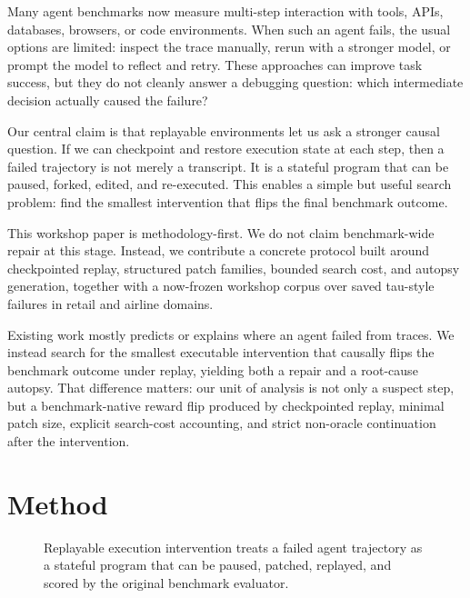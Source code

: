 \documentclass[11pt]{article}
\begin{document}
Many agent benchmarks now measure multi-step interaction with tools, APIs,
databases, browsers, or code environments. When such an agent fails, the usual
options are limited: inspect the trace manually, rerun with a stronger model,
or prompt the model to reflect and retry. These approaches can improve task
success, but they do not cleanly answer a debugging question: which
intermediate decision actually caused the failure?

Our central claim is that replayable environments let us ask a stronger causal
question. If we can checkpoint and restore execution state at each step, then a
failed trajectory is not merely a transcript. It is a stateful program that
can be paused, forked, edited, and re-executed. This enables a simple but
useful search problem: find the smallest intervention that flips the final
benchmark outcome.

This workshop paper is methodology-first. We do not claim benchmark-wide repair
at this stage. Instead, we contribute a concrete protocol built around
checkpointed replay, structured patch families, bounded search cost, and
autopsy generation, together with a now-frozen workshop corpus over saved
tau-style failures in retail and airline domains.

Existing work mostly predicts or explains where an agent failed from traces. We
instead search for the smallest executable intervention that causally flips the
benchmark outcome under replay, yielding both a repair and a root-cause
autopsy. That difference matters: our unit of analysis is not only a suspect
step, but a benchmark-native reward flip produced by checkpointed replay,
minimal patch size, explicit search-cost accounting, and strict non-oracle
continuation after the intervention.

\section{Method}

\begin{figure}[t]
\centering
{}
\caption{Replayable execution intervention treats a failed agent trajectory as a
stateful program that can be paused, patched, replayed, and scored by the
original benchmark evaluator.}
\label{fig:execution_intervention_pipeline}
\end{figure}
\end{document}

